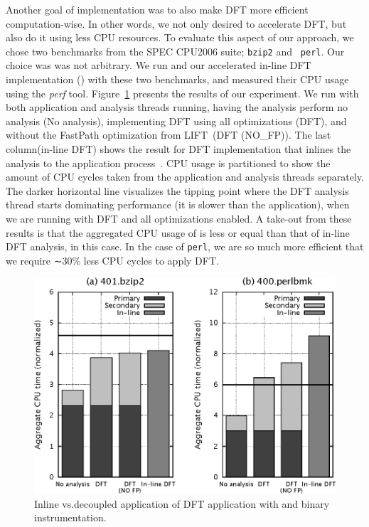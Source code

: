 Another goal of \sreplica implementation was to also make DFT more efficient
computation-wise. In other words, we not only desired to accelerate DFT, but
also do it using less CPU resources. To evaluate this aspect of our approach,
we chose two benchmarks from the SPEC CPU2006 suite; {\tt bzip2} and {\tt
perl}.  Our choice was was not arbitrary. We run \sreplica and our accelerated
in-line DFT implementation (\tfa) with these two benchmarks, and measured their
CPU usage using the {\it perf} tool. Figure~\ref{fig:task0} presents the
results of our experiment. We run \sreplica with both application and analysis
threads running, having the analysis perform no analysis (No analysis),
implementing DFT using all optimizations (DFT), and without the FastPath
optimization from LIFT~\cite{lift:2006micro}(DFT (NO\_FP)). The last
column(in-line DFT) shows the result for DFT implementation that inlines the
analysis to the application process~\cite{tfa:ndss2012}. CPU usage is
partitioned to show the amount of CPU cycles taken from the application and
analysis threads separately. The darker horizontal line visualizes the tipping
point where the DFT analysis thread starts dominating performance (\ie it is
slower than the application), when we are running \sreplica with DFT and all
optimizations enabled.  A take-out from these results is that the aggregated
CPU usage of \sreplica is less or equal than that of in-line DFT analysis, \tfa
in this case. In the case of {\tt perl}, we are so much more efficient that we
require ∼30\% less CPU cycles to apply DFT.

\begin{figure}[tb]
    \centering
    \includegraphics[width=0.6\linewidth]{figs/task0.eps}
    \caption{Inline vs.decoupled application of DFT application with \sreplica
    and binary instrumentation.\label{fig:task0}}
\end{figure}
